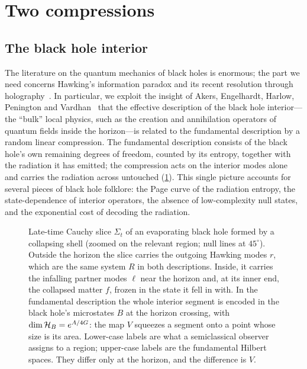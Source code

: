 \section{Two compressions}\label{sec:two}

\subsection{The black hole interior}\label{sec:bh}
The literature on the quantum mechanics of black holes is enormous; the part we need concerns Hawking's information
paradox and its recent resolution through holography~\cite{Penington,AEMM,AEHPV}. In particular, we exploit the
insight of Akers, Engelhardt, Harlow, Penington and Vardhan~\cite{AEHPV} that the effective description of the
black hole interior---the ``bulk'' local physics, such as the creation and annihilation operators of quantum fields
inside the horizon---is related to the fundamental description by a random linear compression. The fundamental
description consists of the black hole's own remaining degrees of freedom, counted by its entropy, together with the
radiation it has emitted; the compression acts on the interior modes alone and carries the radiation across
untouched (\cref{fig:penrose}). This single picture accounts for several pieces of black hole folklore: the Page
curve of the radiation entropy, the state-dependence of interior operators, the absence of low-complexity null
states, and the exponential cost of decoding the radiation.

\begin{figure}[t]
\centering\PenroseSlice
\caption{Late-time Cauchy slice $\Sigma_t$ of an evaporating black hole formed by a collapsing shell (zoomed on the
relevant region; null lines at $45^\circ$). Outside the horizon the slice carries the outgoing Hawking modes $r$,
which are the same system $R$ in both descriptions. Inside, it carries the infalling partner modes $\ell$ near the
horizon and, at its inner end, the collapsed matter $f$, frozen in the state it fell in with. In the fundamental
description the whole interior segment is encoded in the black hole's microstates $B$ at the horizon crossing, with
$\dim\mathcal H_B=e^{A/4G}$: the map $V$ squeezes a segment onto a point whose size is its area. Lower-case labels are
what a semiclassical observer assigns to a region; upper-case labels are the fundamental Hilbert spaces. They differ
only at the horizon, and the difference is $V$.}
\label{fig:penrose}
\end{figure}

